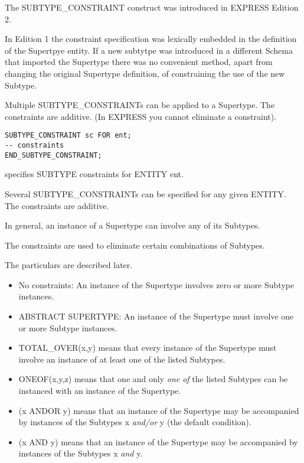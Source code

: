 \begin{remarks}
\remintro


The SUBTYPE\_CONSTRAINT construct was introduced in EXPRESS Edition 2.

    In Edition 1 the constraint specification was lexically embedded in
the definition of the Supertpye entity. If a new subtytpe was introduced
in a different Schema that imported the Supertype there was no convenient 
method, apart from changing the original Supertype definition, of constraining
the use of the new Subtype.

   Multiple SUBTYPE\_CONSTRAINTs can be applied to a Supertype. 
The constraints are additive. (In EXPRESS you cannot eliminate a constraint).


\remend
\end{remarks}


\begin{verbatim}
SUBTYPE_CONSTRAINT sc FOR ent;
-- constraints
END_SUBTYPE_CONSTRAINT;
\end{verbatim}
specifies SUBTYPE constraints for ENTITY ent.

Several SUBTYPE\_CONSTRAINTs can be specified for any
given ENTITY. The constraints are additive.

\begin{remarks}
\remintro


In general, an instance of a Supertype can involve any of its Subtypes.

The constraints are used to eliminate certain combinations of Subtypes.

The particulars are described later.

\remend
\end{remarks}


\begin{itemize}
\item No constraints: An instance of the Supertype involves zero or 
      more Subtype instances.
\item ABSTRACT SUPERTYPE: An instance of the Supertype must involve 
      one or more Subtype instances.
\item TOTAL\_OVER(x,y) means that every instance of the Supertype must 
      involve an instance of at least one of the listed Subtypes.
\item ONEOF(x,y,z) means that one and only \emph{one of} the listed Subtypes
can be instanced with an instance of the Supertype.
\item (x ANDOR y) means that an instance of the Supertype may be accompanied by
instances of the Subtypes x \emph{and/or} y (the default condition).
\item (x AND y)  means that an instance of the Supertype may be accompanied by
instances of the Subtypes x \emph{and} y.
\end{itemize}

